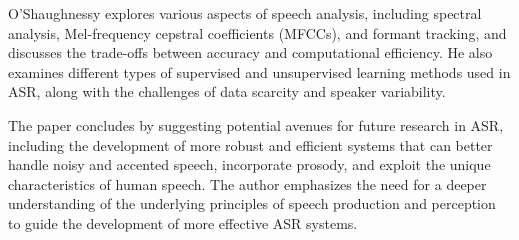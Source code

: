 O'Shaughnessy explores various aspects of speech analysis, including spectral analysis, Mel-frequency cepstral coefficients (MFCCs), and formant tracking, and discusses the trade-offs between accuracy and computational efficiency. He also examines different types of supervised and unsupervised learning methods used in ASR, along with the challenges of data scarcity and speaker variability.

The paper concludes by suggesting potential avenues for future research in ASR, including the development of more robust and efficient systems that can better handle noisy and accented speech, incorporate prosody, and exploit the unique characteristics of human speech. The author emphasizes the need for a deeper understanding of the underlying principles of speech production and perception to guide the development of more effective ASR systems.

